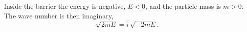 \documentclass{article}
\begin{document}
Inside the barrier the energy is negative, $E<0$, and the particle mass is $m>0$.
The wave number is then imaginary,
\begin{equation}
\sqrt{2 m E} = i\,\sqrt{-2 m E} .
\label{eq:k}
\end{equation}
\end{document}
